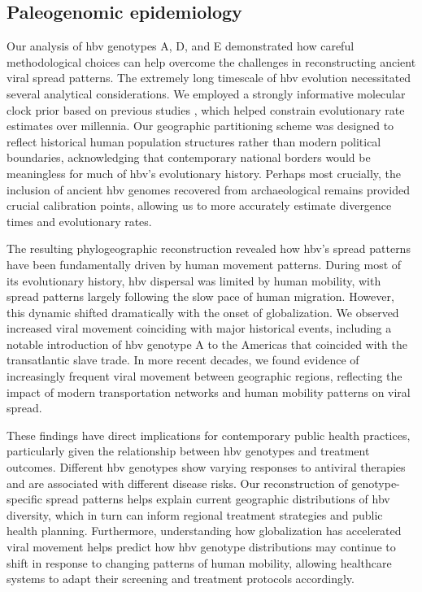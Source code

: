 \subsection{Paleogenomic epidemiology}
Our analysis of \gls{hbv} genotypes A, D, and E demonstrated how careful methodological choices can help overcome the challenges in reconstructing ancient viral spread patterns.
The extremely long timescale of \gls{hbv} evolution necessitated several analytical considerations.
We employed a strongly informative molecular clock prior based on previous studies \citep{kocher2021ten}, which helped constrain evolutionary rate estimates over millennia.
Our geographic partitioning scheme was designed to reflect historical human population structures rather than modern political boundaries, acknowledging that contemporary national borders would be meaningless for much of \gls{hbv}'s evolutionary history.
Perhaps most crucially, the inclusion of ancient \gls{hbv} genomes recovered from archaeological remains provided crucial calibration points, allowing us to more accurately estimate divergence times and evolutionary rates.

The resulting phylogeographic reconstruction revealed how \gls{hbv}'s spread patterns have been fundamentally driven by human movement patterns.
During most of its evolutionary history, \gls{hbv} dispersal was limited by human mobility, with spread patterns largely following the slow pace of human migration.
However, this dynamic shifted dramatically with the onset of globalization.
We observed increased viral movement coinciding with major historical events, including a notable introduction of \gls{hbv} genotype A to the Americas that coincided with the transatlantic slave trade.
In more recent decades, we found evidence of increasingly frequent viral movement between geographic regions, reflecting the impact of modern transportation networks and human mobility patterns on viral spread.

These findings have direct implications for contemporary public health practices, particularly given the relationship between \gls{hbv} genotypes and treatment outcomes.
Different \gls{hbv} genotypes show varying responses to antiviral therapies and are associated with different disease risks.
Our reconstruction of genotype-specific spread patterns helps explain current geographic distributions of \gls{hbv} diversity, which in turn can inform regional treatment strategies and public health planning.
Furthermore, understanding how globalization has accelerated viral movement helps predict how \gls{hbv} genotype distributions may continue to shift in response to changing patterns of human mobility, allowing healthcare systems to adapt their screening and treatment protocols accordingly.

